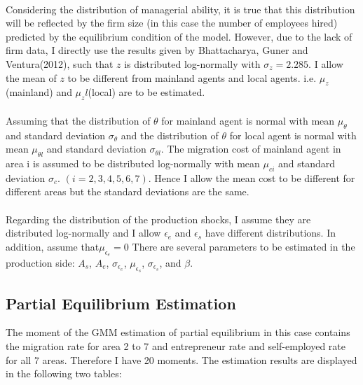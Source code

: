 \documentclass[12pt]{article}
\begin{document}
\paragraph{}
Considering the distribution of managerial ability, it is true that this distribution will be reflected by the firm size (in this case the number of employees hired) predicted by the equilibrium condition of the model. However, due to the lack of firm data, I directly use the results given by Bhattacharya, Guner and Ventura(2012), such that $z$ is distributed log-normally with $\sigma_z=2.285$. I allow the mean of $z$ to be different from mainland agents and local agents. i.e. $\mu_z$(mainland) and $\mu_z l$(local) are to be estimated.

\paragraph{}
Assuming that the distribution of $\theta$ for mainland agent is normal with mean $\mu_{\theta}$ and standard deviation $\sigma_{\theta}$ and the distribution of $\theta$ for local agent is normal with mean $\mu_{\theta l}$ and standard deviation $\sigma_{\theta l}$. The migration cost of mainland agent in area i is assumed to be distributed log-normally with mean $\mu_{ci}$ and standard deviation $\sigma_c$. $(i=2,3,4,5,6,7)$. Hence I allow the mean cost to be different for different areas but the standard deviations are the same. 

\paragraph{}
Regarding the distribution of the production shocks, I assume they are distributed log-normally and I allow $\epsilon_e$ and $\epsilon_s$ have different distributions. In addition, assume that$\mu_{\epsilon_e}=0$ There are several parameters to be estimated in the production side: $A_s$, $A_e$, $\sigma_{\epsilon_e}$, $\mu_{\epsilon_s}$, $\sigma_{\epsilon_s}$, and $\beta$. 

\bigskip
\subsection{Partial Equilibrium Estimation}
The moment of the GMM estimation of partial equilibrium in this case contains the migration rate for area 2 to 7 and entrepreneur rate and self-employed rate for all 7 areas. Therefore I have 20 moments. The estimation results are displayed in the following two tables:
\end{document}
